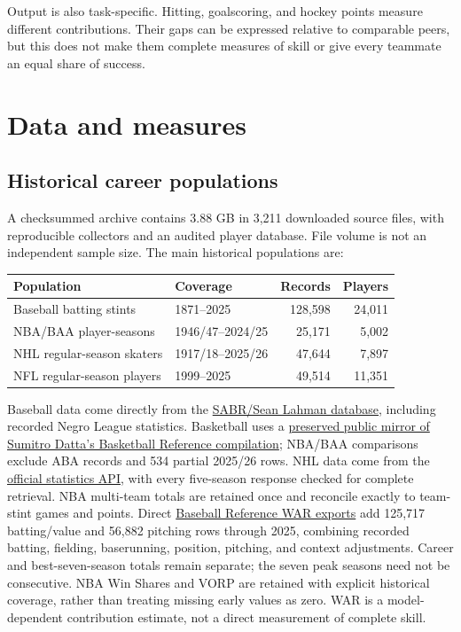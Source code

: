 \documentclass[11pt,letterpaper]{article}
\newcommand{\src}[2]{\href{#1}{#2}}
\begin{document}
Output is also task-specific.
Hitting, goalscoring, and hockey points measure different contributions.
Their gaps can be expressed relative to comparable peers, but this does not make them complete measures of skill or give every teammate an equal share of success.

\section{Data and measures}

\subsection{Historical career populations}

A checksummed archive contains 3.88 GB in 3,211 downloaded source files, with reproducible collectors and an audited player database.
File volume is not an independent sample size.
The main historical populations are:
\begin{center}
\small
\begin{tabular}{@{}llrr@{}}
\toprule
Population & Coverage & Records & Players \\
\midrule
Baseball batting stints & 1871--2025 & 128,598 & 24,011 \\
NBA/BAA player-seasons & 1946/47--2024/25 & 25,171 & 5,002 \\
NHL regular-season skaters & 1917/18--2025/26 & 47,644 & 7,897 \\
NFL regular-season players & 1999--2025 & 49,514 & 11,351 \\
\bottomrule
\end{tabular}
\end{center}
Baseball data come directly from the \src{https://sabr.org/lahman-database/}{SABR/Sean Lahman database}, including recorded Negro League statistics.
Basketball uses a \src{https://github.com/cmuchina3/nba-stats-1947-present-curated}{preserved public mirror of Sumitro Datta's Basketball Reference compilation}; NBA/BAA comparisons exclude ABA records and 534 partial 2025/26 rows.
NHL data come from the \src{https://www.nhl.com/stats/}{official statistics API}, with every five-season response checked for complete retrieval.
NBA multi-team totals are retained once and reconcile exactly to team-stint games and points.
Direct \src{https://www.baseball-reference.com/about/war_explained.shtml}{Baseball Reference WAR exports} add 125,717 batting/value and 56,882 pitching rows through 2025, combining recorded batting, fielding, baserunning, position, pitching, and context adjustments.
Career and best-seven-season totals remain separate; the seven peak seasons need not be consecutive.
NBA Win Shares and VORP are retained with explicit historical coverage, rather than treating missing early values as zero.
WAR is a model-dependent contribution estimate, not a direct measurement of complete skill.
\end{document}
